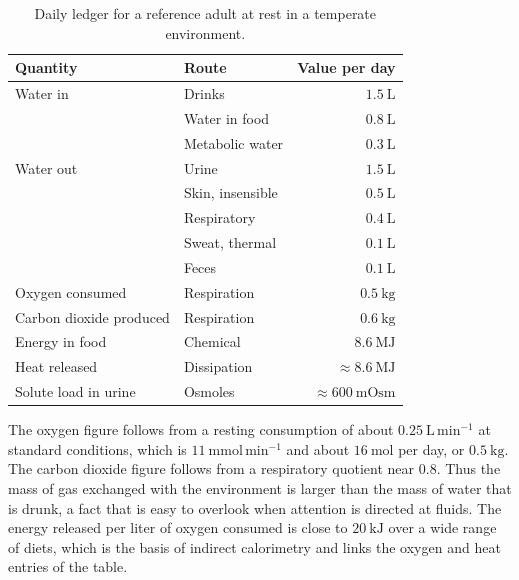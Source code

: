 \documentclass[11pt,openany]{book}
\theoremstyle{definition}
\theoremstyle{remark}
\begin{document}
\begin{table}[ht]
\centering
\caption{Daily ledger for a reference adult at rest in a temperate environment.}
\label{tab:ledger}
\begin{tabular}{@{}llr@{}}
\toprule
Quantity & Route & Value per day \\
\midrule
Water in & Drinks & $1.5\ \mathrm{L}$ \\
 & Water in food & $0.8\ \mathrm{L}$ \\
 & Metabolic water & $0.3\ \mathrm{L}$ \\
Water out & Urine & $1.5\ \mathrm{L}$ \\
 & Skin, insensible & $0.5\ \mathrm{L}$ \\
 & Respiratory & $0.4\ \mathrm{L}$ \\
 & Sweat, thermal & $0.1\ \mathrm{L}$ \\
 & Feces & $0.1\ \mathrm{L}$ \\
Oxygen consumed & Respiration & $0.5\ \mathrm{kg}$ \\
Carbon dioxide produced & Respiration & $0.6\ \mathrm{kg}$ \\
Energy in food & Chemical & $8.6\ \mathrm{MJ}$ \\
Heat released & Dissipation & $\approx 8.6\ \mathrm{MJ}$ \\
Solute load in urine & Osmoles & $\approx 600\ \mathrm{mOsm}$ \\
\bottomrule
\end{tabular}
\end{table}

The oxygen figure follows from a resting consumption of about $0.25\ \mathrm{L\,min^{-1}}$ at standard conditions, which is $11\ \mathrm{mmol\,min^{-1}}$ and about $16\ \mathrm{mol}$ per day, or $0.5\ \mathrm{kg}$. The carbon dioxide figure follows from a respiratory quotient near $0.8$. Thus the mass of gas exchanged with the environment is larger than the mass of water that is drunk, a fact that is easy to overlook when attention is directed at fluids. The energy released per liter of oxygen consumed is close to $20\ \mathrm{kJ}$ over a wide range of diets, which is the basis of indirect calorimetry and links the oxygen and heat entries of the table.
\end{document}
